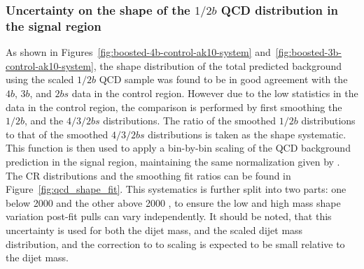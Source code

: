 \clearpage
\subsubsection{Uncertainty on the shape of the $1/2b$ QCD distribution in the signal region}
\label{unc-shape-qcd-in-sr}

As shown in Figures~\ref{fig:boosted-4b-control-ak10-system} and~\ref{fig:boosted-3b-control-ak10-system}, the shape distribution of the total predicted background using the scaled $1/2b$ QCD sample was found to be in good agreement with the $4b$, $3b$, and $2bs$ data in the control region.  However due to the low statistics in the data in the control region, the comparison is performed by first smoothing the $1/2b$, and the $4/3/2bs$ distributions. The ratio of the smoothed $1/2b$ distributions to that of the smoothed $4/3/2bs$ distributions is taken as the shape systematic. This function is then used to apply a bin-by-bin scaling of the QCD background prediction in the signal region, maintaining the same normalization given by \muqcd.  The CR distributions and the smoothing fit ratios can be found in Figure~\ref{fig:qcd_shape_fit}. This systematics is further split into two parts: one below 2000 \GeV and the other above 2000 \GeV, to ensure the low and high mass shape variation post-fit pulls can vary independently. It should be noted, that this uncertainty is used for both the dijet mass, and the scaled dijet mass distribution, and the correction to to scaling is expected to be small relative to the dijet mass. 


